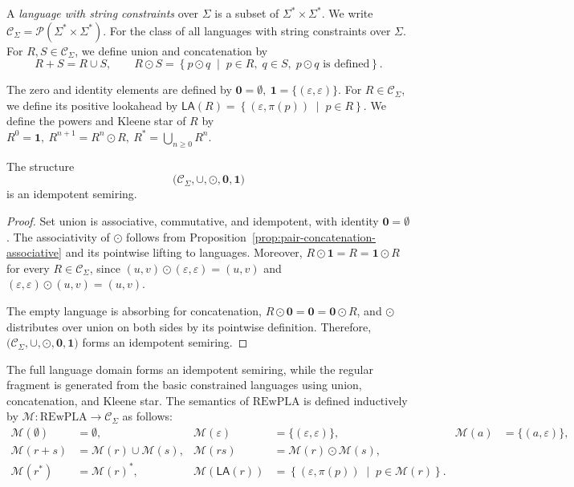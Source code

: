 A \emph{language with string constraints} over $\Sigma$ is a subset of
$\Sigma^*\times\Sigma^*$. We write $ \mathcal{C}_{\Sigma} = \mathcal{P}(\Sigma^*\times\Sigma^*)$. For the class of all languages with string constraints over $\Sigma$.
For $R,S\in\mathcal{C}_{\Sigma}$, we define union and concatenation by
\begin{equation}
R+S = R\cup S,
\qquad
R\odot S
=
\left\{
p\odot q
\;\middle|\;
p\in R,\;
q\in S,\;
p\odot q \text{ is defined}
\right\}.
\label{eq:language-operations}
\end{equation}

The zero and identity elements are defined by $ \mathbf{0}=\emptyset, \: \mathbf{1}=\{(\varepsilon,\varepsilon)\}. $ For $R\in\mathcal{C}_{\Sigma}$, we define its positive lookahead by $
\mathsf{LA}(R)
=
\left\{
(\varepsilon,\pi(p))
\;\middle|\;
p\in R
\right\}.
$ We define the powers and Kleene star of $R$ by
$
R^0=\mathbf{1},
\:
R^{n+1}=R^n\odot R,
\:
R^*=\bigcup_{n\geq 0}R^n .
$


\begin{proposition}
\label{prop:string-constraint-idempotent-semiring}
The structure
\begin{equation}
\bigl(
\mathcal{C}_{\Sigma},
\cup,
\odot,
\mathbf{0},
\mathbf{1}
\bigr)
\label{eq:string-constraint-idempotent-semiring}
\end{equation}
is an idempotent semiring.
\end{proposition}
\begin{proof}
Set union is associative, commutative, and idempotent, with identity
$\mathbf{0}=\emptyset$. The associativity of $\odot$ follows from
Proposition~\ref{prop:pair-concatenation-associative} and its pointwise
lifting to languages. Moreover,
$R\odot\mathbf{1}=R=\mathbf{1}\odot R$ for every
$R\in\mathcal{C}_{\Sigma}$, since
$(u,v)\odot(\varepsilon,\varepsilon)=(u,v)$ and
$(\varepsilon,\varepsilon)\odot(u,v)=(u,v)$.

The empty language is absorbing for concatenation,
$R\odot\mathbf{0}=\mathbf{0}=\mathbf{0}\odot R$, and $\odot$
distributes over union on both sides by its pointwise definition.
Therefore,
$\bigl(\mathcal{C}_{\Sigma},\cup,\odot,\mathbf{0},\mathbf{1}\bigr)$
forms an idempotent semiring.
\end{proof}
The full language domain forms an idempotent semiring, while the regular fragment is generated from the basic constrained languages using union, concatenation, and Kleene star. The semantics of $\mathrm{REwPLA}$ is defined inductively by
$\mathcal{M}:\mathrm{REwPLA}\to\mathcal{C}_{\Sigma}$ as follows:
\begin{equation}
\begin{aligned}
\mathcal{M}(\emptyset)
&=\emptyset,
&
\mathcal{M}(\varepsilon)
&=\{(\varepsilon,\varepsilon)\},
&
\mathcal{M}(a)
&=\{(a,\varepsilon)\},
\\
\mathcal{M}(r+s)
&=\mathcal{M}(r)\cup\mathcal{M}(s),
&
\mathcal{M}(rs)
&=\mathcal{M}(r)\odot\mathcal{M}(s),
\\
\mathcal{M}(r^*)
&=\mathcal{M}(r)^*,
&
\mathcal{M}(\mathsf{LA}(r))
&=
\left\{
(\varepsilon,\pi(p))
\;\middle|\;
p\in\mathcal{M}(r)
\right\}.
\end{aligned}
\label{eq:rewpla-semantics}
\end{equation}

